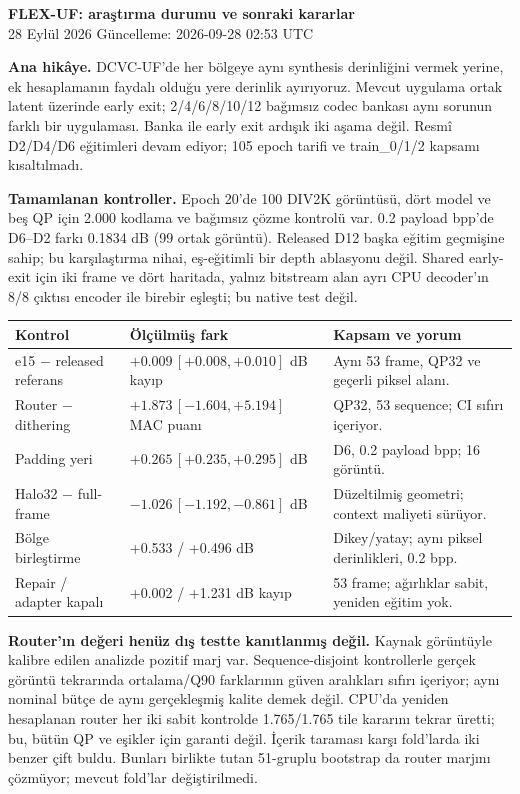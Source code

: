 \documentclass[10pt,a4paper]{article}
\begin{document}
\color{ink}
{\Large\bfseries FLEX-UF: araştırma durumu ve sonraki kararlar}\\[3pt]
{\small 28 Eylül 2026 \quad Güncelleme: 2026-09-28 02:53 UTC}

\textbf{Ana hikâye.} DCVC-UF'de her bölgeye aynı synthesis derinliğini vermek
yerine, ek hesaplamanın faydalı olduğu yere derinlik ayırıyoruz. Mevcut
uygulama ortak latent üzerinde early exit; 2/4/6/8/10/12 bağımsız codec
bankası aynı sorunun farklı bir uygulaması. Banka ile early exit ardışık
iki aşama değil. Resmî D2/D4/D6 eğitimleri devam ediyor; 105 epoch tarifi
ve train\_0/1/2 kapsamı kısaltılmadı.

\textbf{Tamamlanan kontroller.} Epoch 20'de 100 DIV2K görüntüsü, dört model
ve beş QP için 2.000 kodlama ve bağımsız çözme kontrolü var.
0.2 payload bpp'de D6--D2 farkı 0.1834 dB (99 ortak görüntü).
Released D12 başka eğitim geçmişine sahip; bu karşılaştırma nihai,
eş-eğitimli bir depth ablasyonu değil.
Shared early-exit için iki frame ve dört haritada, yalnız bitstream alan
ayrı CPU decoder'ın 8/8 çıktısı encoder ile birebir eşleşti; bu native test değil.

{\small
\begin{tabular}{@{}p{35mm}p{57mm}p{76mm}@{}}\toprule
Kontrol & Ölçülmüş fark & Kapsam ve yorum\\\midrule
e15 $-$ released referans & $+0.009\,[+0.008, +0.010]$ dB kayıp & Aynı 53 frame, QP32 ve geçerli piksel alanı.\\
Router $-$ dithering & $+1.873\,[-1.604, +5.194]$ MAC puanı & QP32, 53 sequence; CI sıfırı içeriyor.\\
Padding yeri & $+0.265\,[+0.235, +0.295]$ dB & D6, 0.2 payload bpp; 16 görüntü.\\
Halo32 $-$ full-frame & $-1.026\,[-1.192, -0.861]$ dB & Düzeltilmiş geometri; context maliyeti sürüyor.\\
Bölge birleştirme & +0.533 / +0.496 dB & Dikey/yatay; aynı piksel derinlikleri, 0.2 bpp.\\
Repair / adapter kapalı & +0.002 / +1.231 dB kayıp & 53 frame; ağırlıklar sabit, yeniden eğitim yok.\\
\bottomrule\end{tabular}}

\textbf{Router'ın değeri henüz dış testte kanıtlanmış değil.}
Kaynak görüntüyle kalibre edilen analizde pozitif marj var. Sequence-disjoint
kontrollerle gerçek görüntü tekrarında ortalama/Q90 farklarının güven
aralıkları sıfırı içeriyor; aynı nominal bütçe de aynı gerçekleşmiş kalite
demek değil. CPU'da yeniden hesaplanan router her iki sabit kontrolde
1.765/1.765 tile kararını tekrar üretti; bu, bütün QP ve eşikler için garanti değil.
İçerik taraması karşı fold'larda iki benzer çift buldu. Bunları birlikte
tutan 51-gruplu bootstrap da router marjını çözmüyor; mevcut fold'lar değiştirilmedi.
\end{document}
